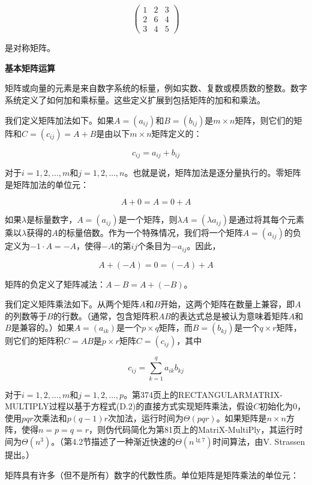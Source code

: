 \documentclass[lang=cn,newtx,10pt,scheme=chinese]{elegantbook}
\begin{document}
\begin{enumerate}
$$
\left(\begin{array}{lll}
1 & 2 & 3 \\
2 & 6 & 4 \\
3 & 4 & 5
\end{array}\right)
$$

是对称矩阵。
\end{enumerate}

\textbf{基本矩阵运算}

矩阵或向量的元素是来自数字系统的标量，例如实数、复数或模质数的整数。数字系统定义了如何加和乘标量。这些定义扩展到包括矩阵的加和和乘法。

我们定义矩阵加法如下。如果$A=\left(a_{i j}\right)$和$B=\left(b_{i j}\right)$是$m \times n$矩阵，则它们的矩阵和$C=\left(c_{i j}\right)=A+B$是由以下$m \times n$矩阵定义的：

$$
c_{i j}=a_{i j}+b_{i j}
$$

对于$i=1,2, \ldots, m$和$j=1,2, \ldots, n$。也就是说，矩阵加法是逐分量执行的。零矩阵是矩阵加法的单位元：

$$
A+0=A=0+A
$$

如果$\lambda$是标量数字，$A=\left(a_{i j}\right)$是一个矩阵，则$\lambda A=\left(\lambda a_{i j}\right)$是通过将其每个元素乘以$\lambda$获得的$A$的标量倍数。作为一个特殊情况，我们将一个矩阵$A=\left(a_{i j}\right)$的负定义为$-1 \cdot A=-A$，使得$-A$的第$i j$个条目为$-a_{i j}$。因此，

$$
A+(-A)=0=(-A)+A
$$

矩阵的负定义了矩阵减法：$A-B=A+(-B)$。

我们定义矩阵乘法如下。从两个矩阵$A$和$B$开始，这两个矩阵在数量上兼容，即$A$的列数等于$B$的行数。（通常，包含矩阵积$AB$的表达式总是被认为意味着矩阵$A$和$B$是兼容的。）如果$A=\left(a_{i k}\right)$是一个$p \times q$矩阵，而$B=\left(b_{k j}\right)$是一个$q \times r$矩阵，则它们的矩阵积$C=AB$是$p \times r$矩阵$C=\left(c_{i j}\right)$，其中

$$
c_{i j}=\sum_{k=1}^q a_{i k} b_{k j}
$$

对于$i=1,2, \ldots, m$和$j=1,2, \ldots, p$。第374页上的RECTANGULARMATRIX-MULTIPLY过程以基于方程式(D.2)的直接方式实现矩阵乘法，假设$C$初始化为0，使用$p q r$次乘法和$p(q-1) r$次加法，运行时间为$\Theta(p q r)$。如果矩阵是$n \times n$方阵，使得$n=p=q=r$，则伪代码简化为第81页上的MatriX-MultiPly，其运行时间为$\Theta\left(n^3\right)$。（第4.2节描述了一种渐近快速的$\Theta\left(n^{\lg 7}\right)$时间算法，由V. Strassen提出。）

矩阵具有许多（但不是所有）数字的代数性质。单位矩阵是矩阵乘法的单位元：
\end{document}
